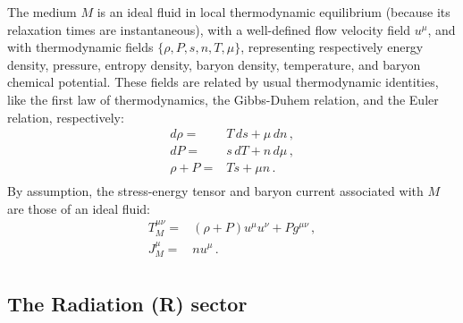 \documentclass[a4paper, amsfonts, amssymb, amsmath, reprint, showkeys, nofootinbib, twoside,notitlepage,onecolumn]{revtex4-2}
\theoremstyle{definition}
\theoremstyle{theorem}
\theoremstyle{corollary}
\begin{document}
The medium $M$ is an ideal fluid in local thermodynamic equilibrium (because its relaxation times are instantaneous), with a well-defined flow velocity field $u^\mu$, and with thermodynamic fields $\{\rho,P,s,n,T,\mu \}$, representing respectively energy density, pressure, entropy density, baryon density, temperature, and baryon chemical potential. These fields are related by usual thermodynamic identities, like the first law of thermodynamics, the Gibbs-Duhem relation, and the Euler relation, respectively:
\begin{equation}
\begin{split}
d\rho ={}& T \, ds +\mu \, dn \, , \\
dP ={}& s \, dT +n \, d\mu \, , \\
\rho{+}P ={}& Ts +\mu n \, . \\
\end{split}
\end{equation}
By assumption, the stress-energy tensor and baryon current associated with $M$ are those of an ideal fluid:
\begin{equation}
\begin{split}
T_M^{\mu \nu}={}& (\rho{+}P)u^\mu u^\nu +P g^{\mu \nu} \, ,\\
J_M^\mu ={}& n u^\mu \, . \\
\end{split}
\end{equation}


\subsection{The Radiation (R) sector}
\end{document}
